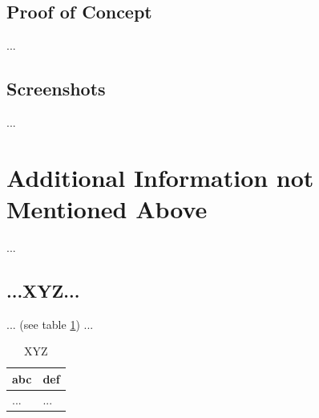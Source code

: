 \subsection{Proof of Concept}\label{osee-sec:sec3-poc}
%
...
%
%
%
\subsection{Screenshots}\label{osee-sec:sec3-screens}
%
...
%
%
%
\section{Additional Information not Mentioned Above}\label{osee-sec:last}
%
...
%
%
%
\subsection{...XYZ...}\label{osee-sec:last-xyz}
%
... (see table \ref{osee-tbl:last-xyz}) ...

\begin{table}[H]
    \begin{tabularx}{\textwidth}{l|l}
        \textbf{abc} & \textbf{def} \\
        \hline
        ... & ...\\
    \end{tabularx}
    \caption{XYZ\label{osee-tbl:last-xyz}}
\end{table}
%
%
%